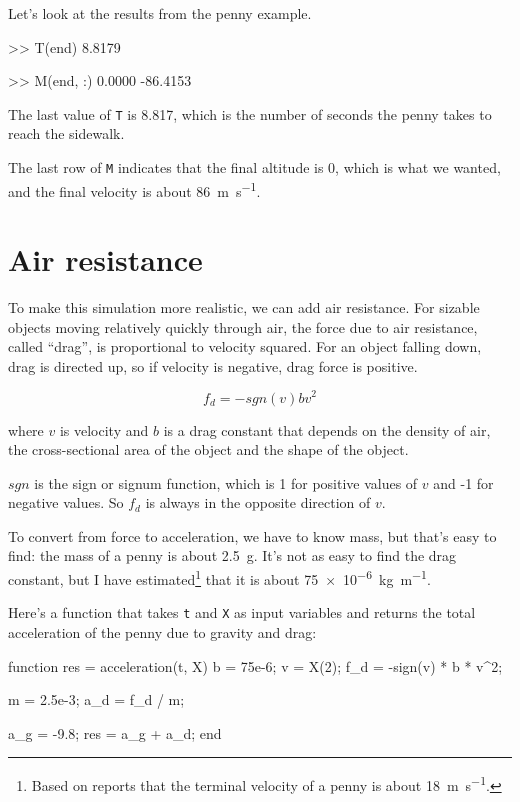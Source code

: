 \documentclass[
]{book}
\numberwithin{Answer}{chapter}
\numberwithin{Exercise}{chapter}
\begin{document}
Let's look at the results from the penny example.  

\begin{code}
>> T(end)
8.8179

>> M(end, :)
0.0000  -86.4153
\end{code}

The last value of {\tt T} is 8.817, which is the number of seconds the penny takes to reach the sidewalk.

The last row of {\tt M} indicates that the final altitude is 0, which is what we wanted, and the final velocity is about \SI{86}{\meter \per \second}.


\section{Air resistance}
\label{sect:air_resistance}

To make this simulation more realistic, we can add air resistance.
For sizable objects moving relatively quickly through air, the force due to air resistance, called ``drag'', is proportional to velocity squared.  
For an object falling down, drag is
directed up, so if velocity is negative, drag force is positive.

\begin{equation}\label{eq:simpledrag}
    f_{d} = -sgn(v) b v^2 
\end{equation}

where $v$ is velocity and
$b$ is a drag constant that depends on the density of
air, the cross-sectional area of the object and the shape
of the object.  


$sgn$ is the sign or signum function, which is 1 for positive values of 
$v$ and -1 for negative values.  So $f_d$ is always in the opposite direction of $v$.

To convert from force to acceleration, we have to know mass, but that's easy to find: the mass of a penny is about \SI{2.5}{\gram}.  It's not as easy to find the drag constant, but I have estimated\footnote{Based on reports that the terminal velocity of a penny is about \SI{18}{\meter \per \second}.} that it is about \SI{75e-6}{\kilogram \per \meter}.

Here's a function that takes {\tt t} and {\tt X} as input variables and returns the total acceleration of the penny due to gravity and drag:

\begin{code}
function res = acceleration(t, X)
    b = 75e-6;                %
    v = X(2);                 %
    f_d = -sign(v) * b * v^2; %

    m = 2.5e-3;               %
    a_d = f_d / m;            %

    a_g = -9.8;               %
    res = a_g + a_d;          %
end
\end{code}
\end{document}
